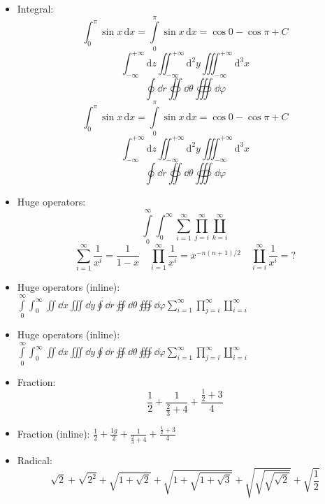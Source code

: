 \documentclass{article}
\begin{document}
\begin{itemize}
  \item Integral:
        \[
            \int_0^\pi        \sin x \, \mathrm{d} x
          = \int\limits_0^\pi \sin x \, \mathrm{d} x
          = \cos 0 - \cos\pi + C
        \]
        \[
          \int_{-\infty}^{+\infty}   \mathrm{d} z
          \iint_{-\infty}^{+\infty}  \mathrm{d}^2 y
          \iiint_{-\infty}^{+\infty} \mathrm{d}^3 x
        \]
        \[ \oint \dd{r} \oiint \dd{\theta} \oiiint \dd{\varphi}\]
        \begingroup
          \[
              \int_0^\pi        \sin x \, \mathrm{d} x
            = \int\limits_0^\pi \sin x \, \mathrm{d} x
            = \cos 0 - \cos\pi + C
          \]
          \[
            \int_{-\infty}^{+\infty}   \mathrm{d} z
            \iint_{-\infty}^{+\infty}  \mathrm{d}^2 y
            \iiint_{-\infty}^{+\infty} \mathrm{d}^3 x
          \]
          \[ \oint \dd{r} \oiint \dd{\theta} \oiiint \dd{\varphi} \]
        \endgroup

  \item Huge operators:
        \[
          \int\limits_0^\infty \int_0^\infty
          \sum_{i=1}^\infty \prod_{j=i}^\infty \coprod_{k=i}^\infty
        \]
        \[
          \sum_{i=1}^\infty    \frac{1}{x^i} = \frac{1}{1-x} \quad
          \prod_{i=1}^\infty   \frac{1}{x^i} = x^{-n(n+1)/2} \quad
          \coprod_{i=i}^\infty \frac{1}{x^i} = ?
        \]

  \item Huge operators (inline):
        $ \int\limits_0^\infty \int_0^\infty \iint \dd{x} \iiint \dd{y}
          \oint \dd{r} \oiint \dd{\theta} \oiiint \dd{\varphi}
          \sum_{i=1}^\infty \prod_{j=i}^\infty \coprod_{i=i}^\infty $

  \item Huge operators (inline):
        \begingroup
          $ \int\limits_0^\infty \int_0^\infty \iint \dd{x} \iiint \dd{y}
            \oint \dd{r} \oiint \dd{\theta} \oiiint \dd{\varphi}
            \sum_{i=1}^\infty \prod_{j=i}^\infty \coprod_{i=i}^\infty $
        \endgroup

  \item Fraction:
        \[ \frac{1}{2} + \frac{1}{\frac{2}{3}+4} + \frac{\frac{1}{2}+3}{4} \]

  \item Fraction (inline):
        $ \frac{1}{2} + \frac{1g}{2} + \frac{1}{\frac{2}{3}+4} + \frac{\frac{1}{2}+3}{4} $

  \item Radical:
        \[
            \sqrt{2} + \sqrt{2^2} + \sqrt{1+\sqrt{2}} + \sqrt{1+\sqrt{1+\sqrt{3}}}
          + \sqrt{\sqrt{\sqrt{\sqrt{2}}}} + \sqrt{\frac{1}{2}}
        \]


\end{itemize}
\end{document}
